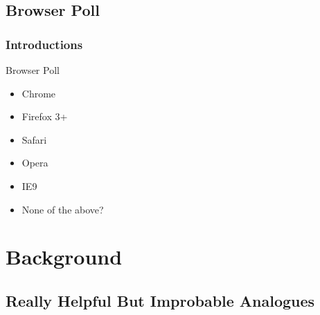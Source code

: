 \documentclass{beamer}
\begin{document}


\subsection{Browser Poll}

\begin{frame}
    \frametitle{Introductions}
\pause
    \begin{block}{Browser Poll}
        \begin{itemize}
\pause
        \item Chrome
\pause
        \item Firefox 3+
\pause
        \item Safari
\pause
        \item Opera
\pause        
        \item IE9
\pause
        \item None of the above?
        \end{itemize}
    \end{block}
\end{frame}


\section{Background}

\subsection{Really Helpful But Improbable Analogues}
\end{document}
